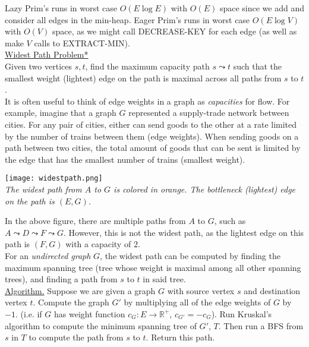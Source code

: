 \documentclass[12pt, fleqn]{general}
\begin{document}
\begin{multicols*}{2}
    Lazy Prim's runs in worst case $O(E \log E)$ with $O(E)$ space since we add and consider all edges in the min-heap. Eager Prim's runs in worst case $O(E\log V)$ with $O(V)$ space, as we might call DECREASE-KEY for each edge (as well as make $V$ calls to EXTRACT-MIN).\\


    {\large \underline{Widest Path Problem*}}\\

    Given two vertices $s, t$, find the maximum capacity path $s \leadsto t$ such that the smallest weight (lightest) edge on the path is maximal across all paths from $s$ to $t$.\\

    It is often useful to think of edge weights in a graph as \emph{capacities} for flow. For example, imagine that a graph $G$ represented a supply-trade network between cities. For any pair of cities, either can send goods to the other at a rate limited by the number of trains between them (edge weights). When sending goods on a path between two cities, the total amount of goods that can be sent is limited by the edge that has the smallest number of trains (smallest
    weight).

    \begin{center}
    \texttt{[image: widestpath.png]}\\
    \emph{The widest path from $A$ to $G$ is colored in orange. The bottleneck (lightest) edge on the path is $(E, G)$.}
    \end{center}

    In the above figure, there are multiple paths from $A$ to $G$, such as $A\leadsto D \leadsto F \leadsto G$. However, this is not the widest path, as the lightest edge on this path is $(F, G)$ with a capacity of $2$.\\

    For an \emph{undirected graph} $G$, the widest path can be computed by finding the maximum spanning tree (tree whose weight is maximal among all other spanning trees), and finding a path from $s$ to $t$ in said tree.\\

    \underline{Algorithm.} Suppose we are given a graph $G$ with source vertex $s$ and destination vertex $t$. Compute the graph $G'$ by multiplying all of the edge weights of $G$ by $-1$. (i.e. if $G$ has weight function $c_G : E \rightarrow \mathbb{R^{+}}$, $c_{G'} = - c_{G}$). Run Kruskal's algorithm to compute the minimum spanning tree of $G'$, $T$. Then run a BFS from $s$ in $T$ to compute the path from $s$ to $t$. Return this path.


\end{multicols*}
\end{document}
